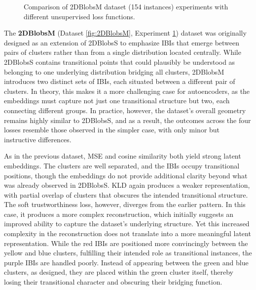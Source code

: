 \begin{figure}[htbp]
  \caption{Comparison of 2DBlobsM dataset (154 instances) experiments with different unsupervised loss functions.}
  \label{fig:RQ2/2DBlobsM}
\end{figure}

The \textbf{2DBlobsM} (Dataset \ref{fig:2DBlobsM}, Experiment \ref{fig:RQ2/2DBlobsM}) dataset was originally designed as an extension of 2DBlobsS to emphasize IBIs that emerge between pairs of clusters rather than from a single distribution located centrally. While 2DBlobsS contains transitional points that could plausibly be understood as belonging to one underlying distribution bridging all clusters, 2DBlobsM introduces two distinct sets of IBIs, each situated between a different pair of clusters. In theory, this makes it a more challenging case for autoencoders, as the embeddings must capture not just one transitional structure but two, each connecting different groups. In practice, however, the dataset’s overall geometry remains highly similar to 2DBlobsS, and as a result, the outcomes across the four losses resemble those observed in the simpler case, with only minor but instructive differences.

As in the previous dataset, MSE and cosine similarity both yield strong latent embeddings. The clusters are well separated, and the IBIs occupy transitional positions, though the embeddings do not provide additional clarity beyond what was already observed in 2DBlobsS. KLD again produces a weaker representation, with partial overlap of clusters that obscures the intended transitional structure. The soft trustworthiness loss, however, diverges from the earlier pattern. In this case, it produces a more complex reconstruction, which initially suggests an improved ability to capture the dataset’s underlying structure. Yet this increased complexity in the reconstruction does not translate into a more meaningful latent representation. While the red IBIs are positioned more convincingly between the yellow and blue clusters, fulfilling their intended role as transitional instances, the purple IBIs are handled poorly. Instead of appearing between the green and blue clusters, as designed, they are placed within the green cluster itself, thereby losing their transitional character and obscuring their bridging function.

